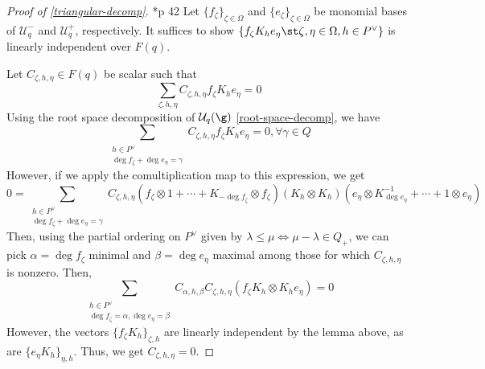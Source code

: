 \documentclass[11pt,leqno,oneside]{amsart}
\numberwithin{thm}{section}
\newcommand{\rootlattice}{Q}
\newcommand{\weightlattice}{P}
\newcommand{\U}{\mathcal{U}}
\begin{document}
\begin{proof}[Proof of \ref{triangular-decomp}]
  \cite{hong-kang}*{p 42} Let \(\{f_\zeta\}_{\zeta \in \Omega}\) and
  \(\{e_\zeta\}_{\zeta \in \Omega}\) be monomial bases of \(\U_q^-\)
  and \(\U_q^+\), respectively. It suffices to show \(\{f_\zeta K_h
  e_\eta \st \zeta, \eta \in \Omega, h \in \weightlattice^\vee\}\) is
  linearly independent over \(F(q)\).

  Let \(C_{\zeta, h, \eta} \in F(q)\) be scalar such that  \[
    \sum_{\zeta, h, \eta}C_{\zeta, h, \eta} f_\zeta K_h e_\eta = 0
  \]
  Using the root space decomposition of \(\U_q(\g)\)
  \ref{root-space-decomp}, we
  have \[
    \sum_{\substack{h \in \weightlattice^\vee \\ \deg f_\zeta + \deg
        e_\eta = \gamma}} C_{\zeta, h, \eta} f_\zeta K_h e_\eta = 0,
    \forall \gamma \in \rootlattice
  \]
  However, if we apply the comultiplication map to this expression, we
  get \[
    0 = \sum_{\substack{h \in \weightlattice^\vee \\ \deg f_\zeta + \deg
        e_\eta = \gamma}} C_{\zeta, h, \eta} (f_\zeta \otimes 1 +
    \cdots + K_{- \deg f_\zeta} \otimes f_\zeta) (K_h \otimes K_h)
    (e_\eta \otimes K^{-1}_{\deg e_\eta} + \cdots + 1 \otimes e_\eta)
  \]
  Then, using the partial ordering on \(\weightlattice^\vee\) given by
  \(\lambda \leq \mu \iff \mu-\lambda \in \rootlattice_+\), we can
  pick \(\alpha = \deg f_\zeta\) minimal and \(\beta = \deg e_\eta\)
  maximal among those for which \(C_{\zeta,h,\eta}\) is
  nonzero. Then, \[
    \sum_{\substack{h \in \weightlattice^\vee \\ \deg f_\zeta =
        \alpha,  \deg
        e_\eta = \beta}} C_{\alpha, h, \beta} C_{\zeta, h, \eta}
    (f_\zeta K_h \otimes K_h e_\eta) = 0
  \]
  However, the vectors \(\{f_\zeta K_h\}_{\zeta,h}\) are linearly
  independent by the 
  lemma above, as are \(\{e_\eta K_h\}_{\eta,h}\). Thus, we get
  \(C_{\zeta,h,\eta} = 0\).
\end{proof}
\end{document}

